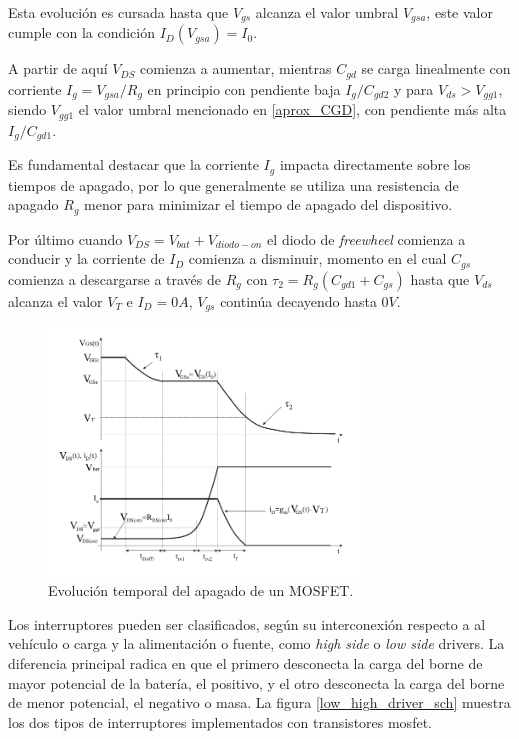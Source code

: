 \documentclass[10pt,a4paper]{article}
\begin{document}
Esta evolución es cursada hasta que $V_{gs}$ alcanza el valor umbral $V_{gsa}$,
este valor cumple con la condición $I_D(V_{gsa})=I_0$.

A partir de aquí $V_{DS}$ comienza a aumentar, mientras $C_{gd}$ se carga
linealmente con corriente $I_g=V_{gsa}/R_g$ en principio con pendiente baja
$I_g/C_{gd2}$ y para $V_{ds} > V_{gg1}$, siendo $V_{gg1}$ el valor umbral
mencionado en \ref{aprox_CGD}, con pendiente más alta $I_g/C_{gd1}$.

Es fundamental destacar que la corriente $I_g$ impacta directamente sobre los
tiempos de apagado, por lo que generalmente se utiliza una resistencia de
apagado $R_g$ menor para minimizar el tiempo de apagado del dispositivo.

Por último cuando $V_{DS} = V_{bat} + V_{diodo-on} $ el diodo de
\emph{freewheel} comienza a conducir y la corriente de $I_D$ comienza a
disminuir, momento en el cual $C_{gs}$ comienza a descargarse a través de $R_g$
con $\tau_2 = R_g (C_{gd1}+C_{gs})$ hasta que $V_{ds}$ alcanza el valor $V_T$ e
$I_D = 0A$, $V_{gs}$ continúa decayendo hasta $0V$.\\

\begin{figure}[h!]
	\begin{center}
		\includegraphics[width=0.75\textwidth]{shutdown_time.pdf}
		\caption{Evolución temporal del apagado de un MOSFET.}
		\label{apagado_time}
	\end{center}
\end{figure}
\FloatBarrier

Los interruptores pueden ser clasificados, según su interconexión respecto a al
vehículo o carga y la alimentación o fuente, como \emph{high side} o \emph{low
side} drivers. La diferencia principal radica en que el primero desconecta la
carga del borne de mayor potencial de la batería, el positivo, y el otro
desconecta la carga del borne de menor potencial, el negativo o masa. La figura
\ref{low_high_driver_sch} muestra los dos tipos de interruptores implementados
con transistores mosfet.
\end{document}
